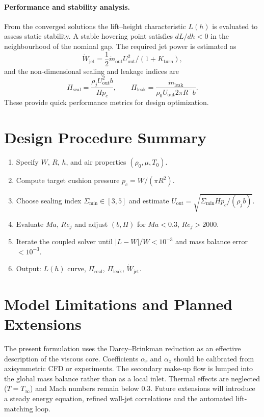 \documentclass[11pt,a4paper]{article}
\begin{document}
\paragraph{Performance and stability analysis.}
From the converged solutions the lift–height characteristic $L(h)$ is evaluated to assess static stability.
A stable hovering point satisfies $dL/dh < 0$ in the neighbourhood of the nominal gap.
The required jet power is estimated as
\[
  \dot W_{\mathrm{jet}} = \frac{1}{2}\dot m_{\mathrm{out}} U_{\mathrm{out}}^2 /(1+K_{\mathrm{turn}}),
\]
and the non-dimensional sealing and leakage indices are
\[
  \Pi_{\mathrm{seal}} = \frac{\rho_j U_{\mathrm{out}}^2 b}{H p_c},
  \qquad
  \Pi_{\mathrm{leak}} = \frac{\dot m_{\mathrm{leak}}}{\rho_0 U_{\mathrm{out}} 2\pi R^{-} b}.
\]
These provide quick performance metrics for design optimization.

\section*{Design Procedure Summary}
\begin{enumerate}
  \item Specify $W$, $R$, $h$, and air properties $(\rho_0,\mu,T_0)$.
  \item Compute target cushion pressure $p_c = W/(\pi R^2)$.
  \item Choose sealing index $\Sigma_{\min}\!\in[3,5]$ and estimate
        $U_{\mathrm{out}}=\sqrt{\Sigma_{\min} H p_c / (\rho_j b)}$.
  \item Evaluate $Ma$, $Re_j$ and adjust $(b,H)$ for $Ma<0.3$, $Re_j>2000$.
  \item Iterate the coupled solver until $|L-W|/W<10^{-3}$ and mass balance error $<10^{-3}$.
  \item Output: $L(h)$ curve, $\Pi_{\mathrm{seal}}$, $\Pi_{\mathrm{leak}}$, $\dot W_{\mathrm{jet}}$.
\end{enumerate}

\section{Model Limitations and Planned Extensions}
\label{sec:model-limitations-and-planned-extensions}

The present formulation uses the Darcy–Brinkman reduction as an effective description of the viscous core.
Coefficients $\alpha_r$ and $\alpha_z$ should be calibrated from axisymmetric CFD or experiments.
The secondary make-up flow is lumped into the global mass balance rather than as a local inlet.
Thermal effects are neglected ($T=T_\infty$) and Mach numbers remain below 0.3.
Future extensions will introduce a steady energy equation, refined wall-jet correlations and the automated lift-matching loop.
\end{document}
